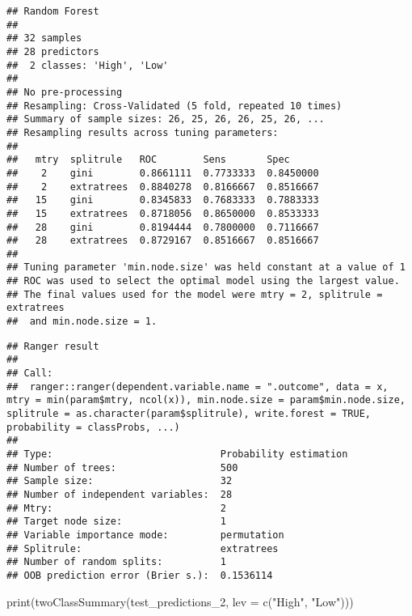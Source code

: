 \documentclass[
  oneside]{book}
\newenvironment{Shaded}{\begin{snugshade}}{\end{snugshade}}
\newcommand{\AttributeTok}[1]{\textcolor[rgb]{0.77,0.63,0.00}{#1}}
\newcommand{\FunctionTok}[1]{\textcolor[rgb]{0.00,0.00,0.00}{#1}}
\newcommand{\NormalTok}[1]{#1}
\newcommand{\SpecialCharTok}[1]{\textcolor[rgb]{0.00,0.00,0.00}{#1}}
\newcommand{\StringTok}[1]{\textcolor[rgb]{0.31,0.60,0.02}{#1}}
\begin{document}
\begin{verbatim}
## Random Forest 
## 
## 32 samples
## 28 predictors
##  2 classes: 'High', 'Low' 
## 
## No pre-processing
## Resampling: Cross-Validated (5 fold, repeated 10 times) 
## Summary of sample sizes: 26, 25, 26, 26, 25, 26, ... 
## Resampling results across tuning parameters:
## 
##   mtry  splitrule   ROC        Sens       Spec     
##    2    gini        0.8661111  0.7733333  0.8450000
##    2    extratrees  0.8840278  0.8166667  0.8516667
##   15    gini        0.8345833  0.7683333  0.7883333
##   15    extratrees  0.8718056  0.8650000  0.8533333
##   28    gini        0.8194444  0.7800000  0.7116667
##   28    extratrees  0.8729167  0.8516667  0.8516667
## 
## Tuning parameter 'min.node.size' was held constant at a value of 1
## ROC was used to select the optimal model using the largest value.
## The final values used for the model were mtry = 2, splitrule = extratrees
##  and min.node.size = 1.
\end{verbatim}

\begin{Shaded}
\end{Shaded}

\begin{verbatim}
## Ranger result
## 
## Call:
##  ranger::ranger(dependent.variable.name = ".outcome", data = x,      mtry = min(param$mtry, ncol(x)), min.node.size = param$min.node.size,      splitrule = as.character(param$splitrule), write.forest = TRUE,      probability = classProbs, ...) 
## 
## Type:                             Probability estimation 
## Number of trees:                  500 
## Sample size:                      32 
## Number of independent variables:  28 
## Mtry:                             2 
## Target node size:                 1 
## Variable importance mode:         permutation 
## Splitrule:                        extratrees 
## Number of random splits:          1 
## OOB prediction error (Brier s.):  0.1536114
\end{verbatim}

\begin{Shaded}
\begin{Highlighting}[]
\FunctionTok{print}\NormalTok{(}\FunctionTok{twoClassSummary}\NormalTok{(test\_predictions\_2, }\AttributeTok{lev =} \FunctionTok{c}\NormalTok{(}\StringTok{"High"}\NormalTok{, }\StringTok{"Low"}\NormalTok{)))}
\end{Highlighting}
\end{Shaded}
\end{document}
